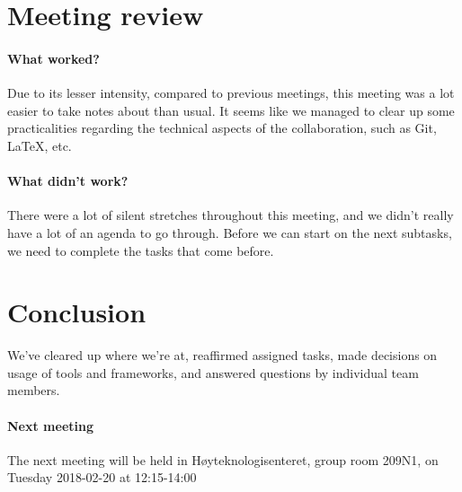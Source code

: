\documentclass{article}
\begin{document}
\section{Meeting review}

\paragraph{What worked?}

Due to its lesser intensity, compared to previous meetings, this meeting was a lot easier to take notes about than usual. It seems like we managed to clear up some practicalities regarding the technical aspects of the collaboration, such as Git, LaTeX, etc.

\paragraph{What didn't work?}

There were a lot of silent stretches throughout this meeting, and we didn't really have a lot of an agenda to go through. Before we can start on the next subtasks, we need to complete the tasks that come before.

\section{Conclusion}

We've cleared up where we're at, reaffirmed assigned tasks, made decisions on usage of tools and frameworks, and answered questions by individual team members.

\paragraph{Next meeting}

The next meeting will be held in Høyteknologisenteret, group room 209N1, on Tuesday 2018-02-20 at 12:15-14:00
\end{document}

